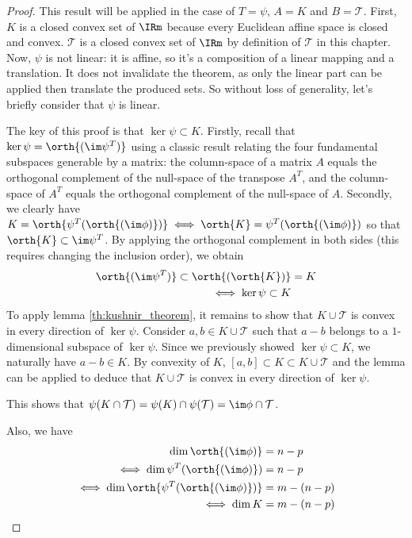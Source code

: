 \begin{proof}
    This result will be applied in the case of $T=\psi$, $A=K$ and $B=\mathcal{T}$. First, $K$ is a closed convex set of $\IRm$ because every Euclidean affine space is closed and convex. $\mathcal{T}$ is a closed convex set of $\IRm$ by definition of $\mathcal{T}$ in this chapter. Now, $\psi$ is not linear: it is affine, so it's a composition of a linear mapping and a translation. It does not invalidate the theorem, as only the linear part can be applied then translate the produced sets. So without loss of generality, let's briefly consider that $\psi$ is linear.

    The key of this proof is that $\ker \psi \subset K$. Firstly, recall that $\ker \psi = \orth{(\im \psi^T)}$ using a classic result relating the four fundamental subspaces generable by a matrix: the column-space of a matrix $A$ equals the orthogonal complement of the null-space of the transpose $A^T$, and the column-space of $A^T$ equals the orthogonal complement of the null-space of $A$. Secondly, we clearly have $K = \orth{\psi^T(\orth{(\im \phi)})} \iff \orth{K} = \psi^T(\orth{(\im \phi)})$ so that $\orth{K}\subset \im \psi^T$. By applying the orthogonal complement in both sides (this requires changing the inclusion order), we obtain
    \begin{align*}
        \orth{(\im \psi^T)} \subset \orth{(\orth{K})} &= K \\
        \iff \ker{\psi} \subset K
    \end{align*}
    To apply lemma \ref{th:kushnir_theorem}, it remains to show that $K\cup \mathcal{T}$ is convex in every direction of $\ker \psi$. Consider $a, b\in K\cup \mathcal{T}$ such that $a-b$ belongs to a $1$-dimensional subspace of $\ker\psi$. Since we previously showed $\ker\psi \subset K$, we naturally have $a-b\in K$. By convexity of $K$, $[a,b]\subset K\subset K\cup \mathcal{T}$ and the lemma can be applied to deduce that $K\cup \mathcal{T}$ is convex in every direction of $\ker \psi$.

    This shows that $\psi(K\cap \mathcal{T}) = \psi(K)\cap\psi(\mathcal{T}) = \im \phi \cap \mathcal{T}$. 
    
    Also, we have 
    \begin{align*}
        \dim \orth{(\im \phi)} &= n - p \\
        \iff \dim \psi^T(\orth{(\im \phi)}) &= n - p \\
        \iff \dim \orth{\psi^T(\orth{(\im \phi)})} &= m - (n-p) \\
        \iff \dim K &= m - (n-p)
    \end{align*}
\end{proof}

